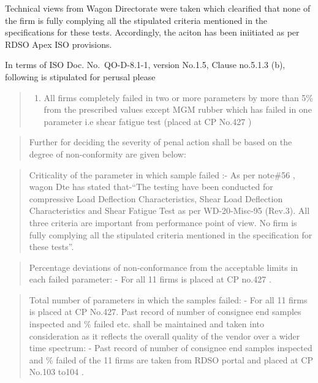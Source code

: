 \documentclass[nofonts,]{tufte-book}
\providecommand{\tightlist}{%
  \setlength{\itemsep}{0pt}\setlength{\parskip}{0pt}}
\begin{document}
Technical views from Wagon Directorate were taken which clearified that
none of the firm is fully complying all the stipulated criteria
mentioned in the specifications for these tests. Accordingly, the aciton
has been iniitiated as per RDSO Apex ISO provisions.

In terms of ISO Doc. No.~QO-D-8.1-1, version No.1.5, Clause no.5.1.3
(b), following is stipulated for perusal please

\begin{quote}
\begin{enumerate}
\def\labelenumi{(\roman{enumi})}
\tightlist
\item
  All firms completely failed in two or more parameters by more than 5\%
  from the prescribed values except MGM rubber which has failed in one
  parameter i.e shear fatigue test (placed at CP No.427 )
\end{enumerate}
\end{quote}

\begin{quote}
Further for deciding the severity of penal action shall be based on the
degree of non-conformity are given below:
\end{quote}

\begin{quote}
Criticality of the parameter in which sample failed :- As per note\#56 ,
wagon Dte has stated that-``The testing have been conducted for
compressive Load Deflection Characteristics, Shear Load Deflection
Characteristics and Shear Fatigue Test as per WD-20-Misc-95 (Rev.3). All
three criteria are important from performance point of view. No firm is
fully complying all the stipulated criteria mentioned in the
specification for these tests''.
\end{quote}

\begin{quote}
Percentage deviations of non-conformance from the acceptable limits in
each failed parameter: - For all 11 firms is placed at CP no.427 .
\end{quote}

\begin{quote}
Total number of parameters in which the samples failed: - For all 11
firms is placed at CP No.427. Past record of number of consignee end
samples inspected and \% failed etc. shall be maintained and taken into
consideration as it reflects the overall quality of the vendor over a
wider time spectrum: - Past record of number of consignee end samples
inspected and \% failed of the 11 firms are taken from RDSO portal and
placed at CP No.103 to104 .
\end{quote}
\end{document}
